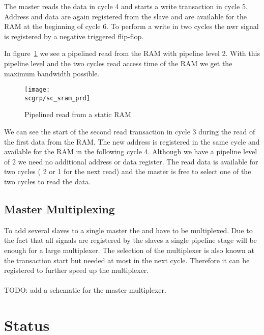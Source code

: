 The master reads the data in cycle 4 and starts a write transaction
in cycle 5. Address and data are again registered from the slave and
are available for the RAM at the beginning of cycle 6. To perform a
write in two cycles the nwr signal is registered by a negative
triggered flip-flop.

In figure~\ref{fig:sc:sram:prd} we see a pipelined read from the RAM
with pipeline level 2. With this pipeline level and the two cycles
read access time of the RAM we get the maximum bandwidth possible.

\begin{figure}
    \centering
    \texttt{[image: \\scgrp/sc\_sram\_prd]}
    \caption{Pipelined read from a static RAM}
    \label{fig:sc:sram:prd}
\end{figure}

We can see the start of the second read transaction in cycle 3
during the read of the first data from the RAM. The new address is
registered in the same cycle and available for the RAM in the
following cycle 4. Although we have a pipeline level of 2 we need no
additional address or data register. The read data is available for
two cycles ( 2 or 1 for the next read) and the master
is free to select one of the two cycles to read the data.

\subsection{Master Multiplexing}

To add several slaves to a single master the  and
 have to be multiplexed. Due to the fact that all
 signals are registered by the slaves a single
pipeline stage will be enough for a large multiplexer. The selection
of the multiplexer is also known at the transaction start but needed
at most in the next cycle. Therefore it can be registered to further
speed up the multiplexer.
\\
\\
TODO: add a schematic for the master  multiplexer.

\section{Status}

